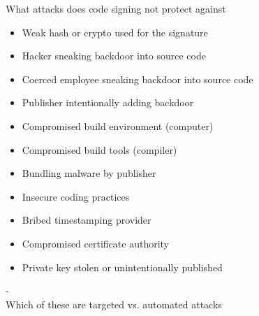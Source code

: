 \documentclass[11pt]{beamer}
\begin{document}
\begin{frame}{What attacks does code signing not protect against}
\begin{itemize}
\item Weak hash or crypto used for the signature
\item Hacker sneaking backdoor into source code
\item Coerced employee sneaking backdoor into source code
\item Publisher intentionally adding backdoor
\item Compromised build environment (computer)
\item Compromised build tools (compiler)
\item Bundling malware by publisher
\item Insecure coding practices
\item Bribed timestamping provider
\item Compromised certificate authority
\item Private key stolen or unintentionally published
\end{itemize}
-\\
Which of these are targeted vs. automated attacks
\end{frame}
\end{document}
